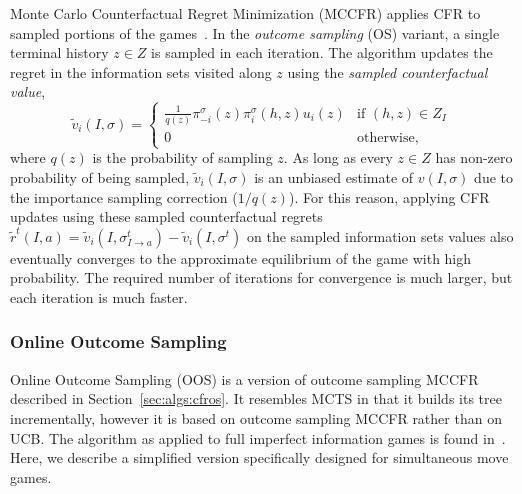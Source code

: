 Monte Carlo Counterfactual Regret Minimization (MCCFR) applies CFR to sampled portions of the games~\cite{Lanctot09Sampling}.
In the {\it outcome sampling} (OS) variant, a single terminal history $z\in Z$ is sampled in each iteration.
The algorithm updates the regret in the information sets visited along $z$ using the
{\it sampled counterfactual value},
\begin{equation}
\tilde{v}_i(I,\sigma) = \left\{
\begin{array}{ll}
\frac{1}{q(z)} \pi^{\sigma}_{-i}(z) \pi^{\sigma}_{i}(h,z) u_i(z) & \mbox{if } (h,z) \in Z_I\\
0  & \mbox{otherwise,}
\end{array} \right.
\label{eq:scv}
\end{equation}
where $q(z)$ is the probability of sampling $z$.
As long as every $z \in Z$ has non-zero probability of being sampled, $\tilde{v}_i(I,\sigma)$ is an unbiased estimate of $v(I,\sigma)$
due to the importance sampling correction ($1/q(z)$). For this reason, applying CFR updates using these sampled counterfactual regrets
$\tilde{r}^t(I,a) = \tilde{v}_i(I,\sigma^t_{I \rightarrow a}) - \tilde{v}_i(I,\sigma^t)$
on the sampled information sets values also eventually converges to the approximate equilibrium of the game with high probability.
The required number of iterations for convergence is much larger, but each iteration is much faster.



\subsubsection{Online Outcome Sampling} \label{sec:oos}

Online Outcome Sampling (OOS) is a version of outcome sampling MCCFR described in 
Section~\ref{sec:algs:cfros}. It resembles MCTS in that it builds its tree incrementally, however it 
is based on outcome sampling MCCFR rather than on UCB. The algorithm as applied to full imperfect information
games is found in~\cite{Lanctot14OOS}. Here, we describe a simplified version specifically designed for 
simultaneous move games. 


